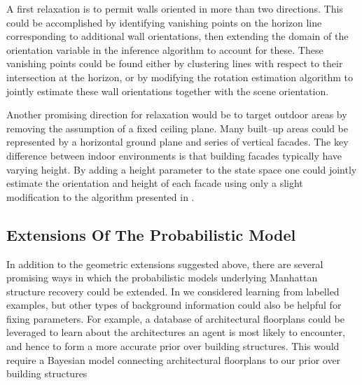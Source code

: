 A first relaxation is to permit walls oriented in more than two
directions. This could be accomplished by identifying vanishing
points on the horizon line corresponding to additional wall
orientations, then extending the domain of the orientation variable in
the inference algorithm to account for these. These vanishing points
could be found either by clustering lines with respect to their
intersection at the horizon, or by modifying the rotation estimation
algorithm to jointly estimate these wall orientations together with
the scene orientation.


Another promising direction for relaxation would be to target outdoor
areas by removing the assumption of a fixed ceiling plane. Many
built--up areas could be represented by a horizontal ground plane and
series of vertical facades. The key difference between indoor
environments is that building facades typically have varying
height. By adding a height parameter to the state space one could
jointly estimate the orientation and height of each facade using only
a slight modification to the algorithm presented in
.

\subsection{Extensions Of The Probabilistic Model}

In addition to the geometric extensions suggested above, there are
several promising ways in which the probabilistic models underlying
Manhattan structure recovery could be extended. In 
we considered learning from labelled examples, but other types of
background information could also be helpful for fixing
parameters. For example, a database of architectural floorplans could
be leveraged to learn about the architectures an agent is most likely
to encounter, and hence to form a more accurate prior over building
structures. This would require a Bayesian model connecting
architectural floorplans to our prior over building structures

